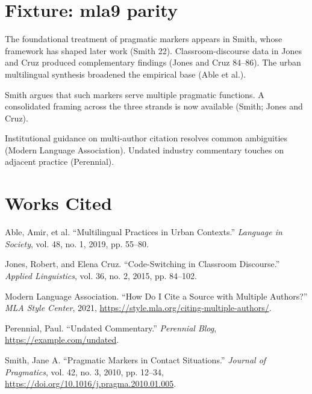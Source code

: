 

\hypertarget{fixture-mla9-parity}{%
\section{Fixture: mla9 parity}\label{fixture-mla9-parity}}

The foundational treatment of pragmatic markers appears in Smith, whose
framework has shaped later work (Smith 22). Classroom-discourse data in
Jones and Cruz produced complementary findings (Jones and Cruz 84--86).
The urban multilingual synthesis broadened the empirical base (Able et
al.).

Smith argues that such markers serve multiple pragmatic functions. A
consolidated framing across the three strands is now available (Smith;
Jones and Cruz).

Institutional guidance on multi-author citation resolves common
ambiguities (Modern Language Association). Undated industry commentary
touches on adjacent practice (Perennial).

\hypertarget{bibliography}{%
\section*{Works Cited}\label{bibliography}}

\hypertarget{refs}{}
\begin{CSLReferences}{1}{0}
\leavevmode{}%
Able, Amir, et al. {``Multilingual Practices in Urban Contexts.''}
\emph{Language in Society}, vol. 48, no. 1, 2019, pp. 55--80.

\leavevmode{}%
Jones, Robert, and Elena Cruz. {``Code-Switching in Classroom
Discourse.''} \emph{Applied Linguistics}, vol. 36, no. 2, 2015, pp.
84--102.

\leavevmode{}%
Modern Language Association. {``How Do I Cite a Source with Multiple
Authors?''} \emph{MLA Style Center}, 2021,
\url{https://style.mla.org/citing-multiple-authors/}.

\leavevmode{}%
Perennial, Paul. {``Undated Commentary.''} \emph{Perennial Blog},
\url{https://example.com/undated}.

\leavevmode{}%
Smith, Jane A. {``Pragmatic Markers in Contact Situations.''}
\emph{Journal of Pragmatics}, vol. 42, no. 3, 2010, pp. 12--34,
\url{https://doi.org/10.1016/j.pragma.2010.01.005}.

\end{CSLReferences}


